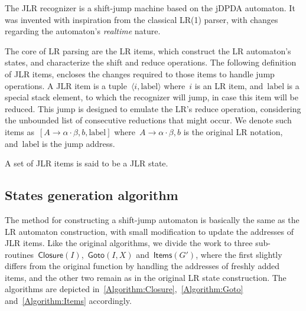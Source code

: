\newcommand\StackLabel{\ensuremath{\textrm{label}}}
\def\function#1(#2){\ensuremath{\textsf{#1}(#2)}}

The JLR recognizer is a shift-jump machine
  based on the jDPDA automaton.
It was invented with inspiration from the classical
  LR(1) parser, with changes regarding the automaton's
  \emph{realtime} nature.

The core of LR parsing are the LR items,
  which construct the LR automaton's states, and
  characterize the shift and reduce operations.
The following definition of JLR items,
  encloses the changes required to those items to handle
  jump operations.
A JLR item is a tuple~$⟨i,\StackLabel⟩$ where~$i$ is an
  LR item, and~$\StackLabel$ is a special stack element,
  to which the recognizer will jump, in case this item will
  be reduced.
This jump is designed to emulate the LR's
  reduce operation, considering the unbounded list of consecutive
  reductions that might occur.
We denote such items as~$[A→α·β, b , \StackLabel]$
  where~$A→α·β, b$ is the original LR notation, and~$\StackLabel$
  is the jump address.

A set of JLR items is said to be a JLR state.

\subsection{States generation algorithm}
The method for constructing a shift-jump automaton
  is basically the same as the LR automaton construction,
  with small modification to update the addresses of JLR items.
Like the original algorithms, we divide the work to three
  sub-routines~$\function Closure(I)$,~$\function Goto(I,X)$ and~$\function Items(G')$,
  where the first slightly differs from the original function by handling the
  addresses of freshly added items, and the other two remain as in the original
  LR state construction.
The algorithms are depicted in~\cref{Algorithm:Closure},~\cref{Algorithm:Goto}
  and~\cref{Algorithm:Items} accordingly.

\newcommand\INPUT\REQUIRE
\newcommand\OUTPUT\ENSURE
\renewcommand{\LET}[2]{\STATE{\textbf{Let} \ensuremath{\text{#1}←\text{#2}}}}
\renewcommand{\algorithmicrequire}{\textbf{Input}}
\renewcommand{\algorithmicensure}{\textbf{Output}}

